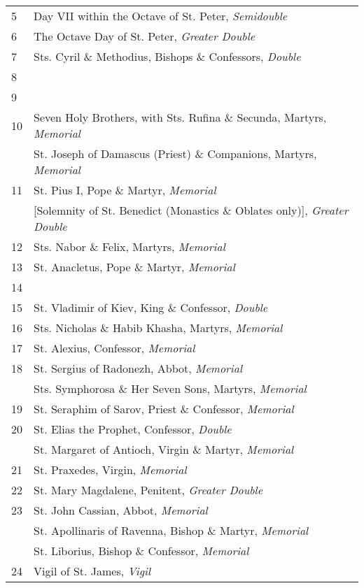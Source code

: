 \begin{longtable}{p{2mm}|p{94mm}}
5&Day VII within the Octave of St. Peter, \textit{Semidouble}\\
6&The Octave Day of St. Peter, \textit{Greater Double}\\
7&Sts. Cyril \& Methodius, Bishops \& Confessors, \textit{Double}\\
8&\\
9&\\
10&Seven Holy Brothers, with Sts. Rufina \& Secunda, Martyrs, \textit{Memorial}\\
&St. Joseph of Damascus (Priest) \& Companions, Martyrs, \textit{Memorial}\\
11&St. Pius I, Pope \& Martyr, \textit{Memorial}\\
&[Solemnity of St. Benedict (Monastics \& Oblates only)], \textit{Greater Double}\\
12&Sts. Nabor \& Felix, Martyrs, \textit{Memorial}\\
13&St. Anacletus, Pope \& Martyr, \textit{Memorial}\\
14&\\
15&St. Vladimir of Kiev, King \& Confessor, \textit{Double}\\
16&Sts. Nicholas \& Habib Khasha, Martyrs, \textit{Memorial}\\
17&St. Alexius, Confessor, \textit{Memorial}\\
18&St. Sergius of Radonezh, Abbot, \textit{Memorial}\\
&Sts. Symphorosa \& Her Seven Sons, Martyrs, \textit{Memorial}\\
19&St. Seraphim of Sarov, Priest \& Confessor, \textit{Memorial}\\
20&St. Elias the Prophet, Confessor, \textit{Double}\\
&St. Margaret of Antioch, Virgin \& Martyr, \textit{Memorial}\\
21&St. Praxedes, Virgin, \textit{Memorial}\\
22&{\color{RubricRed}St. Mary Magdalene, Penitent}, \textit{Greater Double}\\
23&St. John Cassian, Abbot, \textit{Memorial}\\
&St. Apollinaris of Ravenna, Bishop \& Martyr, \textit{Memorial}\\
&St. Liborius, Bishop \& Confessor, \textit{Memorial}\\
24&Vigil of St. James, \textit{Vigil}\\

\end{longtable}
